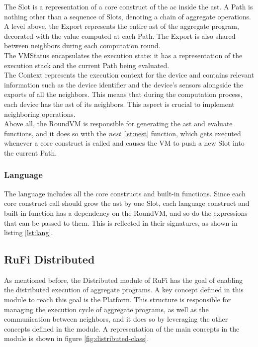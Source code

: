 The Slot is a representation of a core construct of the \ac{ac} inside the \ac{ast}. A Path is nothing other than a sequence of Slots, denoting a chain of aggregate operations.\\
A level above, the Export represents the entire \ac{ast} of the aggregate program, decorated with the value computed at each Path. The Export is also shared between neighbors during each
computation round.\\
The VMStatus encapsulates the execution state: it has a representation of the execution stack and the current Path being evaluated.\\
The Context represents the execution context for the device and contains relevant information such as the device identifier and the device's sensors alongside the exports of all the neighbors.
This means that during the computation process, each device has the \ac{ast} of its neighbors. This aspect is crucial to implement neighboring operations.\\
Above all, the RoundVM is responsible for generating the \ac{ast} and evaluate functions, and it does so with the \textit{nest} \ref{lst:nest} function, which gets executed whenever a core construct is called
and causes the VM to push a new Slot into the current Path.



\subsubsection{Language}
The language includes all the core constructs and built-in functions. Since each core construct call should grow the \ac{ast} by one Slot, each language construct and built-in function has
a dependency on the RoundVM, and so do the expressions that can be passed to them. This is reflected in their signatures, as shown in listing \ref{lst:lang}.



\subsection{RuFi Distributed}
As mentioned before, the Distributed module of RuFi has the goal of enabling the distributed execution of aggregate programs. A key concept defined in this module to reach this goal is the Platform.
This structure is responsible for managing the execution cycle of aggregate programs, as well as the communication between neighbors, and it does so by leveraging the other concepts defined in the module.
A representation of the main concepts in the module is shown in figure \ref{fig:distributed-class}.

